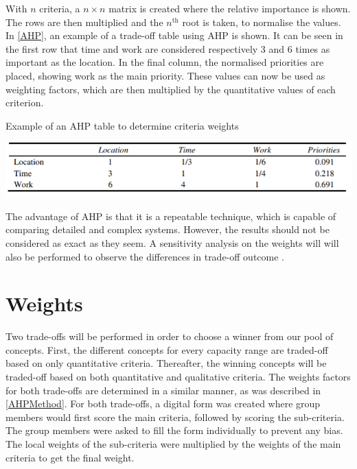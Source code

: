 With $n$ criteria, a $n \times n$ matrix is created where the relative importance is shown. The rows are then multiplied and the $n^\text{th}$ root is taken, to normalise the values. In \autoref{AHP}, an example of a trade-off table using AHP is shown. It can be seen in the first row that time and work are considered respectively 3 and 6 times as important as the location. In the final column, the normalised priorities are placed, showing work as the main priority. These values can now be used as weighting factors, which are then multiplied by the quantitative values of each criterion. 

\begin{table}[H]
    \centering
    \captionsetup{justification=centering}
    \caption{Example of an AHP table to determine criteria weights \cite{AHP}} \vspace{-0.2cm}
    \label{AHP}
    \includegraphics[width=0.75\linewidth]{Figures/AHP.PNG}
\end{table}

The advantage of AHP is that it is a repeatable technique, which is capable of comparing detailed and complex systems. However, the results should not be considered as exact as they seem. A sensitivity analysis on the weights will will also be performed to observe the differences in trade-off outcome \cite{tradeoff}. 

\section{Weights}
\label{subsec:weights}
Two trade-offs will be performed in order to choose a winner from our pool of concepts. First, the different concepts for every capacity range are traded-off based on only quantitative criteria. Thereafter, the winning concepts will be traded-off based on both quantitative and qualitative criteria. The weights factors for both trade-offs are determined in a similar manner, as was described in \autoref{AHPMethod}. For both trade-offs, a digital form was created where group members would first score the main criteria, followed by scoring the sub-criteria. The group members were asked to fill the form individually to prevent any bias. The local weights of the sub-criteria were multiplied by the weights of the main criteria to get the final weight.

